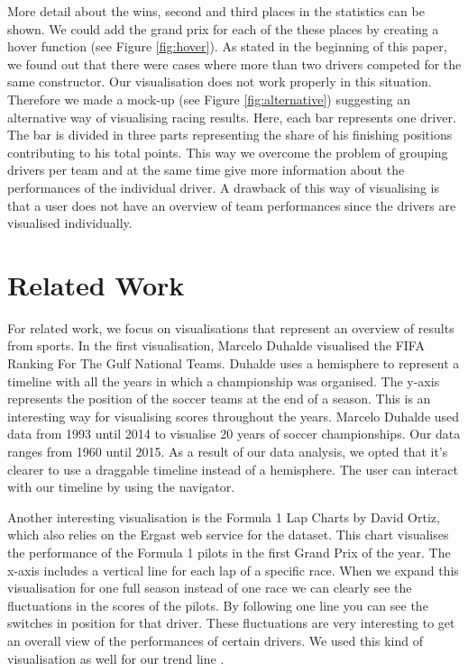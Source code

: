 \documentclass{sigchi}
\begin{document}
More detail about the wins, second and third places in the statistics can be shown. We could add the grand prix for each of the these places by creating a hover function (see Figure \ref{fig:hover}).
As stated in the beginning of this paper, we found out that there were cases where more than two drivers competed for the same constructor. Our visualisation does not work properly in this situation. Therefore we made a mock-up (see Figure \ref{fig:alternative}) suggesting an alternative way of visualising racing results. Here, each bar represents one driver. The bar is divided in three parts representing the share of his finishing positions contributing to his total points. This way we overcome the problem of grouping drivers per team and at the same time give more information about the performances of the individual driver. A drawback of this way of visualising is that a user does not have an overview of team performances since the drivers are visualised individually.



\section{Related Work}

For related work, we focus on visualisations that represent an overview of results from sports. In the first visualisation, Marcelo Duhalde visualised the FIFA Ranking For The Gulf National Teams\cite{fifaranking}. Duhalde uses a hemisphere to represent a timeline with all the years in which a championship was organised. The y-axis represents the position of the soccer teams at the end of a season. This is an interesting way for visualising scores throughout the years. Marcelo Duhalde used data from 1993 until 2014 to visualise 20 years of soccer championships. Our data ranges from 1960 until 2015. As a result of our data analysis, we opted that it’s clearer to use a draggable timeline instead of a hemisphere. The user can interact with our timeline by using the navigator.  

Another interesting visualisation is the Formula 1 Lap Charts by David Ortiz\cite{lapchart}, which also relies on the Ergast web service for the dataset. This chart visualises the performance of the Formula 1 pilots in the first Grand Prix of the year. The x-axis includes a vertical line for each lap of a specific race. When we expand this visualisation for one full season instead of one race we can clearly see the fluctuations in the scores of the pilots. By following one line you can see the switches in position for that driver. These fluctuations are very interesting to get an overall view of the performances of certain drivers. We used this kind of visualisation as well for our trend line .
\end{document}
